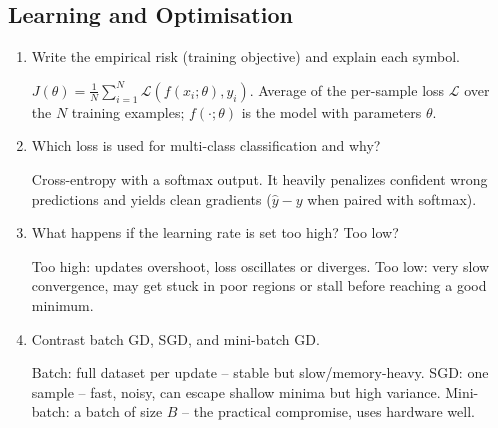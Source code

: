 \documentclass[10pt,a4paper]{article}
\newcommand{\q}[1]{\item #1}
\begin{document}
\subsection{Learning and Optimisation}

\begin{enumerate}[leftmargin=*,label=\textbf{Q\arabic*.}]

\q Write the empirical risk (training objective) and explain each symbol.
\begin{answerbox}
$J(\theta) = \frac{1}{N}\sum_{i=1}^{N}\mathcal{L}(f(x_i;\theta), y_i)$. Average of the per-sample loss $\mathcal{L}$ over the $N$ training examples; $f(\cdot;\theta)$ is the model with parameters $\theta$.
\end{answerbox}

\q Which loss is used for multi-class classification and why?
\begin{answerbox}
Cross-entropy with a softmax output. It heavily penalizes confident wrong predictions and yields clean gradients ($\hat y - y$ when paired with softmax).
\end{answerbox}

\q What happens if the learning rate is set too high? Too low?
\begin{answerbox}
Too high: updates overshoot, loss oscillates or diverges. Too low: very slow convergence, may get stuck in poor regions or stall before reaching a good minimum.
\end{answerbox}

\q Contrast batch GD, SGD, and mini-batch GD.
\begin{answerbox}
Batch: full dataset per update -- stable but slow/memory-heavy. SGD: one sample -- fast, noisy, can escape shallow minima but high variance. Mini-batch: a batch of size $B$ -- the practical compromise, uses hardware well.
\end{answerbox}


\end{enumerate}
\end{document}
